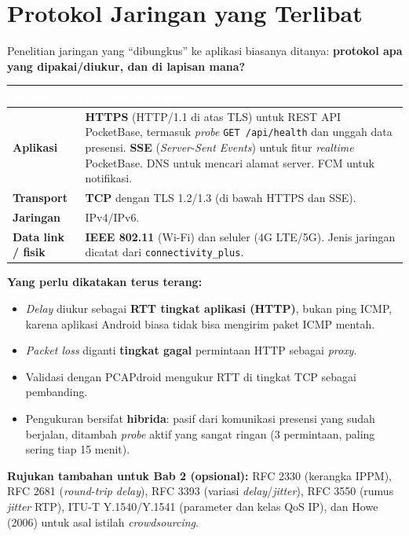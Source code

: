 \documentclass[11pt,a4paper]{article}
\newcommand{\term}[1]{\cellcolor{band}\textbf{#1}}
\newcommand{\kepala}[2]{\rowcolor{head}\textcolor{white}{\textbf{#1}} & \textcolor{white}{\textbf{#2}}\\ \midrule}
\begin{document}
\section{Protokol Jaringan yang Terlibat}
Penelitian jaringan yang ``dibungkus'' ke aplikasi biasanya ditanya: \textbf{protokol apa yang dipakai/diukur, dan di lapisan mana?}
\begin{longtable}{KV}
\toprule
\kepala{Lapisan}{Protokol di aplikasi presensi}
\endhead
\term{Aplikasi} & \textbf{HTTPS} (HTTP/1.1 di atas TLS) untuk REST API PocketBase, termasuk \textit{probe} \texttt{GET /api/health} dan unggah data presensi. \textbf{SSE} (\textit{Server-Sent Events}) untuk fitur \textit{realtime} PocketBase. DNS untuk mencari alamat server. FCM untuk notifikasi. \\
\term{Transport} & \textbf{TCP} dengan TLS 1.2/1.3 (di bawah HTTPS dan SSE). \\
\term{Jaringan} & IPv4/IPv6. \\
\term{Data link / fisik} & \textbf{IEEE 802.11} (Wi-Fi) dan seluler (4G LTE/5G). Jenis jaringan dicatat dari \texttt{connectivity\_plus}. \\
\bottomrule
\end{longtable}
\textbf{Yang perlu dikatakan terus terang:}
\begin{itemize}
\item \textit{Delay} diukur sebagai \textbf{RTT tingkat aplikasi (HTTP)}, bukan ping ICMP, karena aplikasi Android biasa tidak bisa mengirim paket ICMP mentah.
\item \textit{Packet loss} diganti \textbf{tingkat gagal} permintaan HTTP sebagai \textit{proxy}.
\item Validasi dengan PCAPdroid mengukur RTT di tingkat TCP sebagai pembanding.
\item Pengukuran bersifat \textbf{hibrida}: pasif dari komunikasi presensi yang sudah berjalan, ditambah \textit{probe} aktif yang sangat ringan (3 permintaan, paling sering tiap 15 menit).
\end{itemize}
\textbf{Rujukan tambahan untuk Bab 2 (opsional):} RFC 2330 (kerangka IPPM), RFC 2681 (\textit{round-trip delay}), RFC 3393 (variasi \textit{delay}/\textit{jitter}), RFC 3550 (rumus \textit{jitter} RTP), ITU-T Y.1540/Y.1541 (parameter dan kelas QoS IP), dan Howe (2006) untuk asal istilah \textit{crowdsourcing}.

\end{document}
